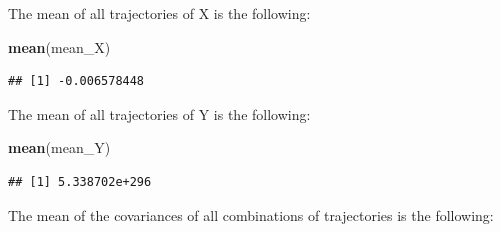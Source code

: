 \documentclass[]{article}
\newenvironment{Shaded}{\begin{snugshade}}{\end{snugshade}}
\newcommand{\ControlFlowTok}[1]{\textcolor[rgb]{0.13,0.29,0.53}{\textbf{#1}}}
\newcommand{\DecValTok}[1]{\textcolor[rgb]{0.00,0.00,0.81}{#1}}
\newcommand{\KeywordTok}[1]{\textcolor[rgb]{0.13,0.29,0.53}{\textbf{#1}}}
\newcommand{\NormalTok}[1]{#1}
\newcommand{\OperatorTok}[1]{\textcolor[rgb]{0.81,0.36,0.00}{\textbf{#1}}}
\newcommand{\StringTok}[1]{\textcolor[rgb]{0.31,0.60,0.02}{#1}}
\begin{document}
\begin{Shaded}
\end{Shaded}

The mean of all trajectories of X is the following:

\begin{Shaded}
\begin{Highlighting}[]
\KeywordTok{mean}\NormalTok{(mean_X)}
\end{Highlighting}
\end{Shaded}

\begin{verbatim}
## [1] -0.006578448
\end{verbatim}

The mean of all trajectories of Y is the following:

\begin{Shaded}
\begin{Highlighting}[]
\KeywordTok{mean}\NormalTok{(mean_Y)}
\end{Highlighting}
\end{Shaded}

\begin{verbatim}
## [1] 5.338702e+296
\end{verbatim}

The mean of the covariances of all combinations of trajectories is the
following:
\end{document}
